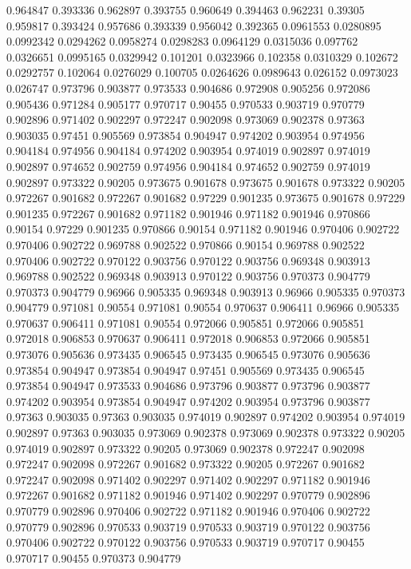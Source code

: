 0.964847 0.393336
0.962897 0.393755
0.960649 0.394463
0.962231 0.39305
0.959817 0.393424
0.957686 0.393339
0.956042 0.392365
0.0961553 0.0280895
0.0992342 0.0294262
0.0958274 0.0298283
0.0964129 0.0315036
0.097762 0.0326651
0.0995165 0.0329942
0.101201 0.0323966
0.102358 0.0310329
0.102672 0.0292757
0.102064 0.0276029
0.100705 0.0264626
0.0989643 0.026152
0.0973023 0.026747
0.973796 0.903877
0.973533 0.904686
0.972908 0.905256
0.972086 0.905436
0.971284 0.905177
0.970717 0.90455
0.970533 0.903719
0.970779 0.902896
0.971402 0.902297
0.972247 0.902098
0.973069 0.902378
0.97363 0.903035
0.97451 0.905569
0.973854 0.904947
0.974202 0.903954
0.974956 0.904184
0.974956 0.904184
0.974202 0.903954
0.974019 0.902897
0.974019 0.902897
0.974652 0.902759
0.974956 0.904184
0.974652 0.902759
0.974019 0.902897
0.973322 0.90205
0.973675 0.901678
0.973675 0.901678
0.973322 0.90205
0.972267 0.901682
0.972267 0.901682
0.97229 0.901235
0.973675 0.901678
0.97229 0.901235
0.972267 0.901682
0.971182 0.901946
0.971182 0.901946
0.970866 0.90154
0.97229 0.901235
0.970866 0.90154
0.971182 0.901946
0.970406 0.902722
0.970406 0.902722
0.969788 0.902522
0.970866 0.90154
0.969788 0.902522
0.970406 0.902722
0.970122 0.903756
0.970122 0.903756
0.969348 0.903913
0.969788 0.902522
0.969348 0.903913
0.970122 0.903756
0.970373 0.904779
0.970373 0.904779
0.96966 0.905335
0.969348 0.903913
0.96966 0.905335
0.970373 0.904779
0.971081 0.90554
0.971081 0.90554
0.970637 0.906411
0.96966 0.905335
0.970637 0.906411
0.971081 0.90554
0.972066 0.905851
0.972066 0.905851
0.972018 0.906853
0.970637 0.906411
0.972018 0.906853
0.972066 0.905851
0.973076 0.905636
0.973435 0.906545
0.973435 0.906545
0.973076 0.905636
0.973854 0.904947
0.973854 0.904947
0.97451 0.905569
0.973435 0.906545
0.973854 0.904947
0.973533 0.904686
0.973796 0.903877
0.973796 0.903877
0.974202 0.903954
0.973854 0.904947
0.974202 0.903954
0.973796 0.903877
0.97363 0.903035
0.97363 0.903035
0.974019 0.902897
0.974202 0.903954
0.974019 0.902897
0.97363 0.903035
0.973069 0.902378
0.973069 0.902378
0.973322 0.90205
0.974019 0.902897
0.973322 0.90205
0.973069 0.902378
0.972247 0.902098
0.972247 0.902098
0.972267 0.901682
0.973322 0.90205
0.972267 0.901682
0.972247 0.902098
0.971402 0.902297
0.971402 0.902297
0.971182 0.901946
0.972267 0.901682
0.971182 0.901946
0.971402 0.902297
0.970779 0.902896
0.970779 0.902896
0.970406 0.902722
0.971182 0.901946
0.970406 0.902722
0.970779 0.902896
0.970533 0.903719
0.970533 0.903719
0.970122 0.903756
0.970406 0.902722
0.970122 0.903756
0.970533 0.903719
0.970717 0.90455
0.970717 0.90455
0.970373 0.904779
